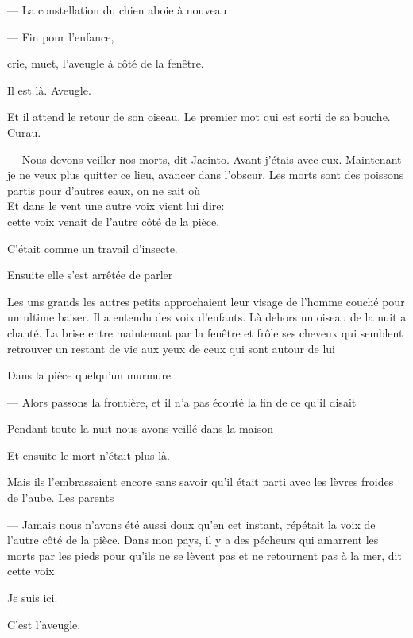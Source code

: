 --- La constellation du chien aboie à nouveau

\breakk

\vspace*{4cm}

--- Fin pour l'enfance,

crie, muet, l'aveugle à côté de la fenêtre.

Il est là. Aveugle.

Et il attend le retour de son oiseau. Le premier mot qui est sorti de sa
bouche. Curau.

--- Nous devons veiller nos morts, dit Jacinto. Avant j'étais avec eux.
Maintenant je ne veux plus quitter ce lieu, avancer dans l'obscur. Les
morts sont des poissons partis pour d'autres eaux, on ne sait où\\

Et dans le vent une autre voix vient lui dire:\\

cette voix venait de l'autre côté de la pièce.

C'était comme un travail d'insecte.

Ensuite elle s'est arrêtée de parler

Les uns grands les autres petits approchaient leur visage de l'homme
couché pour un ultime baiser. Il a entendu des voix d'enfants. Là dehors
un oiseau de la nuit a chanté. La brise entre maintenant par la fenêtre
et frôle ses cheveux qui semblent retrouver un restant de vie aux yeux
de ceux qui sont autour de lui

Dans la pièce quelqu'un murmure

--- Alors passons la frontière, et il n'a pas écouté la fin de ce qu'il
disait

Pendant toute la nuit nous avons veillé dans la maison

Et ensuite le mort n'était plus là.

Mais ils l'embrassaient encore sans savoir qu'il était parti avec les
lèvres froides de l'aube. Les parents

--- Jamais nous n'avons été aussi doux qu'en cet instant, répétait la voix
de l'autre côté de la pièce. Dans mon pays, il y a des pécheurs qui
amarrent les morts par les pieds pour qu'ils ne se lèvent pas et ne
retournent pas à la mer, dit cette voix

\breakk

\vspace*{4cm}

Je suis ici.

C'est l'aveugle.

